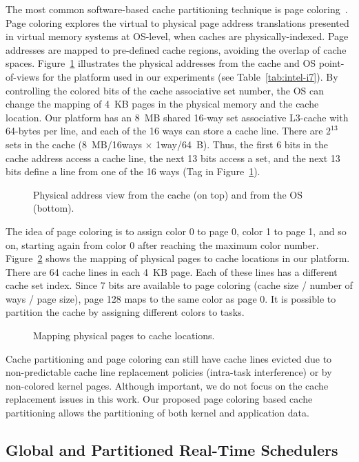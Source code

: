 \documentclass[10pt, conference, compsocconf]{IEEEtran}
\newcommand{\fig}[4][ht!]{
  \begin{figure}[#1]
    {\centering{\texttt{[image: fig/\#2]}}\par}
    \caption{#3}
    \label{fig:#2}
  \end{figure}
}
\begin{document}
The most common software-based cache partitioning technique is page coloring~\cite{Liedtke:1997,Tam:2007,Guan:2009}. Page coloring explores the virtual to physical page address translations presented in virtual memory systems at OS-level, when caches are physically-indexed. Page addresses are mapped to pre-defined cache regions, avoiding the overlap of cache spaces. Figure~\ref{fig:bit_field_cache_intel} illustrates the physical addresses from the cache and OS point-of-views for the platform used in our experiments (see Table~\ref{tab:intel-i7}). By controlling the colored bits of the cache associative set number, the OS can change the mapping of 4~KB pages in the physical memory and the cache location. Our platform has an 8~MB shared 16-way set associative L3-cache with 64-bytes per line, and each of the 16 ways can store a cache line. There are $2^{13}$ sets in the cache (8~MB/16ways $\times$ 1way/64~B). Thus, the first 6 bits in the cache address access a cache line, the next 13 bits access a set, and the next 13 bits define a line from one of the 16 ways (Tag in Figure~\ref{fig:bit_field_cache_intel}).

\fig{bit_field_cache_intel}{Physical address view from the cache (on top) and from the OS (bottom).}{width=6.5cm}

The idea of page coloring is to assign color 0 to page 0, color 1 to page 1, and so on, starting again from color 0 after reaching the maximum color number. Figure~\ref{fig:page_organization} shows the mapping of physical pages to cache locations in our platform. There are 64 cache lines in each 4~KB page. Each of these lines has a different cache set index. Since 7 bits are available to page coloring (cache size / number of ways / page size), page 128 maps to the same color as page 0. It is possible to partition the cache by assigning different colors to tasks.

\fig{page_organization}{Mapping physical pages to cache locations.}{scale=.45}

Cache partitioning and page coloring can still have cache lines evicted due to non-predictable cache line replacement policies (intra-task interference) or by non-colored kernel pages. Although important, we do not focus on the cache replacement issues in this work. Our proposed page coloring based cache partitioning allows the partitioning of both kernel and application data.

\subsection{Global and Partitioned Real-Time Schedulers}
\end{document}
